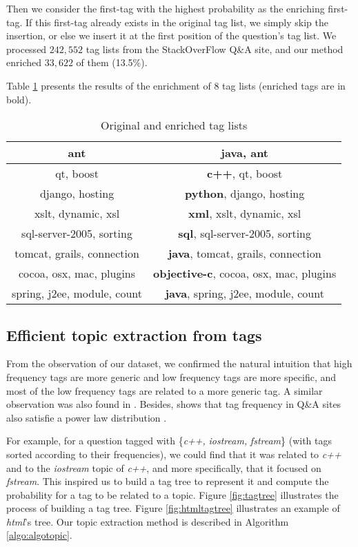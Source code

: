 Then we consider the first-tag with the highest probability as the enriching first-tag. If this first-tag already exists in the original tag list, we simply skip the insertion, or else we insert it at the first position of the question's tag list. We processed $242,552$ tag lists from the StackOverFlow Q\&A site, and our method enriched $33,622$ of them (13.5\%).

Table \ref{tab:enrichedcompare} presents the results of the enrichment of 8 tag lists (enriched tags are in bold).

\begin{table}[htp]
\caption{Original and enriched tag lists}
\label{tab:enrichedcompare}
\centering
\begin{tabular}{|c|c|}
\hline
ant & \textbf{java}, ant\\
\hline
qt, boost& \textbf{c++}, qt, boost\\
\hline
django, hosting & \textbf{python}, django, hosting \\
\hline
xslt, dynamic, xsl & \textbf{xml}, xslt, dynamic, xsl \\
\hline
sql-server-2005, sorting & \textbf{sql}, sql-server-2005, sorting \\
\hline
tomcat, grails, connection & \textbf{java}, tomcat, grails, connection\\
\hline
cocoa, osx, mac, plugins & \textbf{objective-c}, cocoa, osx, mac, plugins \\
\hline
spring, j2ee, module, count & \textbf{java}, spring, j2ee, module, count \\
\hline
\end{tabular}
\end{table}



\subsection{Efficient topic extraction from tags}
\label{subsec:topicextraction}
From the observation of our dataset, we confirmed the natural intuition that high frequency tags are more generic and low frequency tags are more specific, and most of the low frequency tags are related to a more generic tag. A similar observation was also found in \cite{mika2007ontologies}. Besides, \cite{yang2013cqarank} shows that tag frequency in Q\&A sites also satisfie a power law distribution \cite{adamic2000power}.

For example, for a question tagged with \{\textit{c++,} \textit{iostream,} \textit{fstream}\} (with tags sorted according to their frequencies), we could find that it was related to \textit{c++} and to the \textit{iostream} topic of \textit{c++}, and more specifically, that it focused on \textit{fstream}. This inspired us to build a tag tree to represent it and compute the probability for a tag to be related to a topic. Figure \ref{fig:tagtree} illustrates the process of building a tag tree. Figure \ref{fig:htmltagtree} illustrates an example of \textit{html}'s tree. Our topic extraction method is described in Algorithm \ref{algo:algotopic}. 


